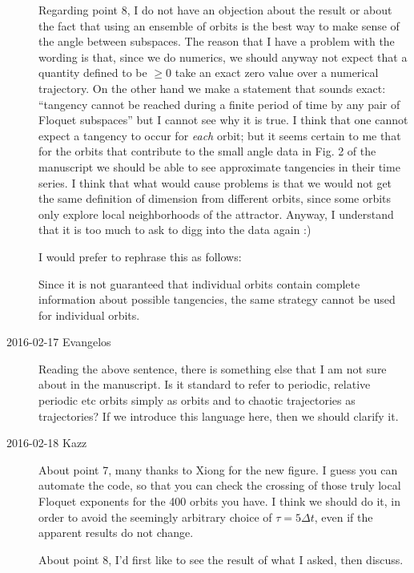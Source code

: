 \begin{description}
Regarding point 8, I do not have an objection about the result
or about the fact that using an ensemble of orbits is the best way
to make sense of the angle between subspaces.
The reason that I have a problem with the wording is that,
since we do numerics, we should anyway not expect that a quantity
defined to be $\geq 0$ take an exact zero value over a
numerical trajectory. On the other hand we make a statement that
sounds exact: ``tangency cannot be reached during a finite period
of time by any pair of Floquet subspaces'' but I cannot
see why it is true. I think that one cannot expect a tangency to
occur for \emph{each} orbit; but it seems certain to me that
for the orbits that contribute to the small angle data in Fig. 2
of the manuscript we should be able to see approximate tangencies
in their time series. I think that what would cause problems is that
we would not get the same definition of dimension from
different orbits, since some orbits only explore local
neighborhoods of the attractor.
Anyway, I understand that it is too much to
ask to digg into the data again :)

I would prefer to rephrase this as follows:

Since it is not guaranteed that individual orbits
contain complete information about possible tangencies,
the same strategy cannot be used for individual orbits.

\item[2016-02-17 Evangelos] Reading the above sentence,
there is something else that I am not sure about in
the manuscript. Is it standard to refer to periodic, relative
periodic etc orbits simply as orbits and to chaotic trajectories
as trajectories? If we introduce this language here,
then we should clarify it.

\item[2016-02-18 Kazz]

About point 7, many thanks to Xiong for the new figure. I guess you can automate the code, so that you can check the crossing of those truly local Floquet exponents for the 400 orbits you have. I think we should do it, in order to avoid the seemingly arbitrary choice of $\tau = 5\Delta t$, even if the apparent results do not change.

About point 8, I'd first like to see the result of what I asked, then discuss.


\end{description}
